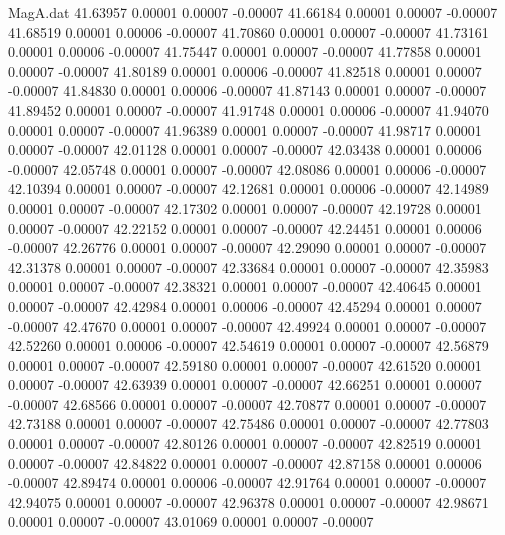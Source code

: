 \begin{filecontents}{MagA.dat}
  41.63957    0.00001    0.00007   -0.00007
  41.66184    0.00001    0.00007   -0.00007
  41.68519    0.00001    0.00006   -0.00007
  41.70860    0.00001    0.00007   -0.00007
  41.73161    0.00001    0.00006   -0.00007
  41.75447    0.00001    0.00007   -0.00007
  41.77858    0.00001    0.00007   -0.00007
  41.80189    0.00001    0.00006   -0.00007
  41.82518    0.00001    0.00007   -0.00007
  41.84830    0.00001    0.00006   -0.00007
  41.87143    0.00001    0.00007   -0.00007
  41.89452    0.00001    0.00007   -0.00007
  41.91748    0.00001    0.00006   -0.00007
  41.94070    0.00001    0.00007   -0.00007
  41.96389    0.00001    0.00007   -0.00007
  41.98717    0.00001    0.00007   -0.00007
  42.01128    0.00001    0.00007   -0.00007
  42.03438    0.00001    0.00006   -0.00007
  42.05748    0.00001    0.00007   -0.00007
  42.08086    0.00001    0.00006   -0.00007
  42.10394    0.00001    0.00007   -0.00007
  42.12681    0.00001    0.00006   -0.00007
  42.14989    0.00001    0.00007   -0.00007
  42.17302    0.00001    0.00007   -0.00007
  42.19728    0.00001    0.00007   -0.00007
  42.22152    0.00001    0.00007   -0.00007
  42.24451    0.00001    0.00006   -0.00007
  42.26776    0.00001    0.00007   -0.00007
  42.29090    0.00001    0.00007   -0.00007
  42.31378    0.00001    0.00007   -0.00007
  42.33684    0.00001    0.00007   -0.00007
  42.35983    0.00001    0.00007   -0.00007
  42.38321    0.00001    0.00007   -0.00007
  42.40645    0.00001    0.00007   -0.00007
  42.42984    0.00001    0.00006   -0.00007
  42.45294    0.00001    0.00007   -0.00007
  42.47670    0.00001    0.00007   -0.00007
  42.49924    0.00001    0.00007   -0.00007
  42.52260    0.00001    0.00006   -0.00007
  42.54619    0.00001    0.00007   -0.00007
  42.56879    0.00001    0.00007   -0.00007
  42.59180    0.00001    0.00007   -0.00007
  42.61520    0.00001    0.00007   -0.00007
  42.63939    0.00001    0.00007   -0.00007
  42.66251    0.00001    0.00007   -0.00007
  42.68566    0.00001    0.00007   -0.00007
  42.70877    0.00001    0.00007   -0.00007
  42.73188    0.00001    0.00007   -0.00007
  42.75486    0.00001    0.00007   -0.00007
  42.77803    0.00001    0.00007   -0.00007
  42.80126    0.00001    0.00007   -0.00007
  42.82519    0.00001    0.00007   -0.00007
  42.84822    0.00001    0.00007   -0.00007
  42.87158    0.00001    0.00006   -0.00007
  42.89474    0.00001    0.00006   -0.00007
  42.91764    0.00001    0.00007   -0.00007
  42.94075    0.00001    0.00007   -0.00007
  42.96378    0.00001    0.00007   -0.00007
  42.98671    0.00001    0.00007   -0.00007
  43.01069    0.00001    0.00007   -0.00007

\end{filecontents}
